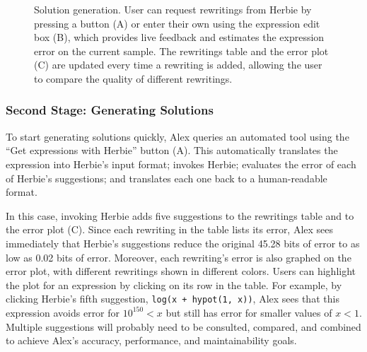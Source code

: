 \begin{figure}
  \centering
  \caption{Solution generation. 
  User can request rewritings from Herbie by pressing a button (A)
    or enter their own using the expression edit box (B), which provides
    live feedback and estimates the expression error on the current sample.
  The rewritings table and the error plot (C) are updated every time a rewriting
    is added, allowing the user to compare the quality of different rewritings.}

  \label{fig:generation}
\end{figure}

\subsubsection*{Second Stage: Generating Solutions}

To start generating solutions quickly,
  Alex queries an automated tool using
  the ``Get expressions with Herbie'' button
  (A).
This automatically translates the expression
  into Herbie's input format;
  invokes Herbie;
  evaluates the error of each of Herbie's suggestions;
  and translates each one back to a human-readable format.

In this case, invoking Herbie
  adds five suggestions to the rewritings table
  and to the error plot (C).
Since each rewriting in the table lists its error,
  Alex sees immediately that Herbie's suggestions
  reduce the original 45.28 bits of error
  to as low as 0.02 bits of error.
Moreover, each rewriting's error is also graphed on the error plot,
  with different rewritings shown in different colors.
Users can highlight the plot for an expression 
  by clicking on its row in the table.
For example, by clicking Herbie's fifth suggestion,
  \texttt{log(x + hypot(1, x))},
  Alex sees that this expression avoids
  error for $10^{150} < x$
  but still has error for smaller values of $x < 1$.
Multiple suggestions will probably need to be consulted,
  compared, and combined
  to achieve Alex's accuracy, performance, and maintainability goals.


